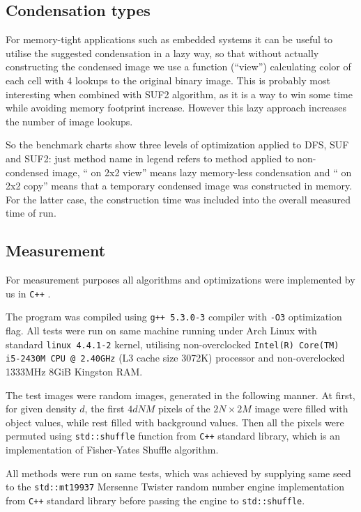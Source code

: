 \documentclass[hidelinks]{llncs}
\newcommand{\texten}[1]{#1}
\newcommand{\textru}[1]{}
\newcommand{\CXX}{\texttt{C++} \xspace}
\begin{document}
\subsection{Condensation types}

\texten{
For memory-tight applications such as embedded systems it can be useful to
utilise the suggested condensation in a lazy way, so that without actually
constructing the condensed image we use a function (``view'') calculating color
of each cell with 4 lookups to the original binary image. This is probably most
interesting when combined with SUF2 algorithm, as it is a way to win some time
while avoiding memory footprint increase. However this lazy approach increases
the number of image lookups.
}\textru{
В некоторых случаях может быть более приемлемо использовать сжатие неявно, то
есть вместо построения 
}

So the benchmark charts show three levels of optimization applied to DFS, SUF
and SUF2: just method name in legend refers to method applied to non-condensed
image, `` on 2x2 view'' means lazy memory-less condensation and `` on 2x2 copy''
means that a temporary condensed image was constructed in memory. For the latter
case, the construction time was included into the overall measured time of run.

\subsection{Measurement}

For measurement purposes all algorithms and optimizations were implemented by us
in \CXX.

The program was compiled using \texttt{g++ 5.3.0-3} compiler with \texttt{-O3}
optimization flag. All tests were run on same machine running under Arch Linux
with standard \texttt{linux 4.4.1-2} kernel, utilising non-overclocked
\texttt{Intel(R) Core(TM) i5-2430M CPU @ 2.40GHz} (L3 cache size 3072K)
processor and non-overclocked 1333MHz 8GiB Kingston RAM.

The test images were random images, generated in the following manner. At first,
for given density $d$, the first $4dNM$ pixels of the $2N \times 2M$ image were
filled with object values, while rest filled with background values. Then all
the pixels were permuted using \texttt{std::shuffle} function from \CXX standard
library, which is an implementation of Fisher-Yates Shuffle algorithm.

All methods were run on same tests, which was achieved by supplying same seed to
the \texttt{std::mt19937} Mersenne Twister\cite{mt19937} random number engine
implementation from \CXX standard library before passing the engine to
\texttt{std::shuffle}.
\end{document}
